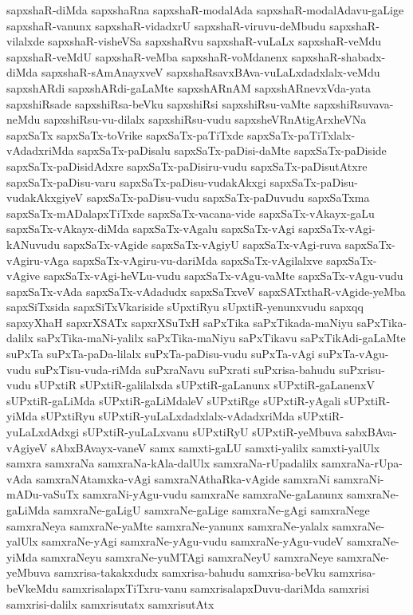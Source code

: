 {sapxshaR-diMda
sapxshaRna
sapxshaR-modalAda
sapxshaR-modalAdavu-gaLige
sapxshaR-vanunx
sapxshaR-vidadxrU
sapxshaR-viruvu-deMbudu
sapxshaR-vilalxde
sapxshaR-visheVSa
sapxshaRvu
sapxshaR-vuLaLx
sapxshaR-veMdu
sapxshaR-veMdU
sapxshaR-veMba
sapxshaR-voMdanenx
sapxshaR-shabadx-diMda
sapxshaR-sAmAnayxveV
sapxshaRsavxBAva-vuLaLxdadxlalx-veMdu
sapxshARdi
sapxshARdi-gaLaMte
sapxshARnAM
sapxshARnevxVda-yata
sapxshiRsade
sapxshiRsa-beVku
sapxshiRsi
sapxshiRsu-vaMte
sapxshiRsuvava-neMdu
sapxshiRsu-vu-dilalx
sapxshiRsu-vudu
sapxsheVRnAtigArxheVNa
sapxSaTx
sapxSaTx-toVrike
sapxSaTx-paTiTxde
sapxSaTx-paTiTxlalx-vAdadxriMda
sapxSaTx-paDisalu
sapxSaTx-paDisi-daMte
sapxSaTx-paDiside
sapxSaTx-paDisidAdxre
sapxSaTx-paDisiru-vudu
sapxSaTx-paDisutAtxre
sapxSaTx-paDisu-varu
sapxSaTx-paDisu-vudakAkxgi
sapxSaTx-paDisu-vudakAkxgiyeV
sapxSaTx-paDisu-vudu
sapxSaTx-paDuvudu
sapxSaTxma
sapxSaTx-mADalapxTiTxde
sapxSaTx-vacana-vide
sapxSaTx-vAkayx-gaLu
sapxSaTx-vAkayx-diMda
sapxSaTx-vAgalu
sapxSaTx-vAgi
sapxSaTx-vAgi-kANuvudu
sapxSaTx-vAgide
sapxSaTx-vAgiyU
sapxSaTx-vAgi-ruva
sapxSaTx-vAgiru-vAga
sapxSaTx-vAgiru-vu-dariMda
sapxSaTx-vAgilalxve
sapxSaTx-vAgive
sapxSaTx-vAgi-heVLu-vudu
sapxSaTx-vAgu-vaMte
sapxSaTx-vAgu-vudu
sapxSaTx-vAda
sapxSaTx-vAdadudx
sapxSaTxveV
sapxSATxthaR-vAgide-yeMba
sapxSiTxsida
sapxSiTxVkariside
sUpxtiRyu
sUpxtiR-yenunxvudu
sapxqq
sapxyXhaH
sapxrXSATx
sapxrXSuTxH
saPxTika
saPxTikada-maNiyu
saPxTika-dalilx
saPxTika-maNi-yalilx
saPxTika-maNiyu
saPxTikavu
saPxTikAdi-gaLaMte
suPxTa
suPxTa-paDa-lilalx
suPxTa-paDisu-vudu
suPxTa-vAgi
suPxTa-vAgu-vudu
suPxTisu-vuda-riMda
suPxraNavu
suPxrati
suPxrisa-bahudu
suPxrisu-vudu
sUPxtiR
sUPxtiR-galilalxda
sUPxtiR-gaLanunx
sUPxtiR-gaLanenxV
sUPxtiR-gaLiMda
sUPxtiR-gaLiMdaleV
sUPxtiRge
sUPxtiR-yAgali
sUPxtiR-yiMda
sUPxtiRyu
sUPxtiR-yuLaLxdadxlalx-vAdadxriMda
sUPxtiR-yuLaLxdAdxgi
sUPxtiR-yuLaLxvanu
sUPxtiRyU
sUPxtiR-yeMbuva
sabxBAva-vAgiyeV
sAbxBAvayx-vaneV
samx
samxti-gaLU
samxti-yalilx
samxti-yalUlx
samxra
samxraNa
samxraNa-kAla-dalUlx
samxraNa-rUpadalilx
samxraNa-rUpa-vAda
samxraNAtamxka-vAgi
samxraNAthaRka-vAgide
samxraNi
samxraNi-mADu-vaSuTx
samxraNi-yAgu-vudu
samxraNe
samxraNe-gaLanunx
samxraNe-gaLiMda
samxraNe-gaLigU
samxraNe-gaLige
samxraNe-gAgi
samxraNege
samxraNeya
samxraNe-yaMte
samxraNe-yanunx
samxraNe-yalalx
samxraNe-yalUlx
samxraNe-yAgi
samxraNe-yAgu-vudu
samxraNe-yAgu-vudeV
samxraNe-yiMda
samxraNeyu
samxraNe-yuMTAgi
samxraNeyU
samxraNeye
samxraNe-yeMbuva
samxrisa-takakxdudx
samxrisa-bahudu
samxrisa-beVku
samxrisa-beVkeMdu
samxrisalapxTiTxru-vanu
samxrisalapxDuvu-dariMda
samxrisi
samxrisi-dalilx
samxrisutatx
samxrisutAtx
}
